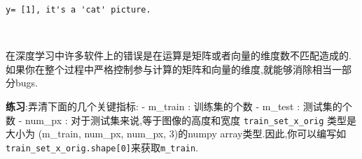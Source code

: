 \documentclass[11pt]{article}
\begin{document}
    \begin{Verbatim}[commandchars=\\\{\}]
y= [1], it's a 'cat' picture.

    \end{Verbatim}

    \begin{center}
    \end{center}
    { \hspace*{\fill} \\}
    
    在深度学习中许多软件上的错误是在运算是矩阵或者向量的维度数不匹配造成的.如果你在整个过程中严格控制参与计算的矩阵和向量的维度,就能够消除相当一部分bugs.

\textbf{练习}:弄清下面的几个关键指标: - m\_train : 训练集的个数 -
m\_test : 测试集的个数 - num\_px : 对于测试集来说,等于图像的高度和宽度
\texttt{train\_set\_x\_orig} 类型是大小为 (m\_train, num\_px, num\_px,
3)的numpy
array类型.因此,你可以编写如\texttt{train\_set\_x\_orig.shape{[}0{]}}来获取\texttt{m\_train}.
\end{document}
